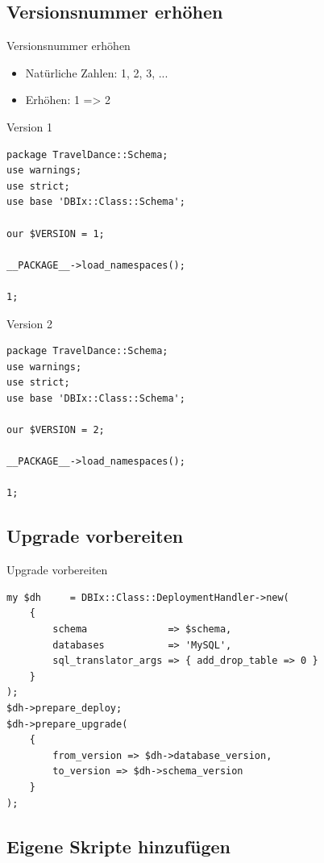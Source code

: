 \subsection{Versionsnummer erhöhen}
\begin{frame}{Versionsnummer erhöhen}
\begin{itemize}
\item Natürliche Zahlen: 1, 2, 3, ...
\item Erhöhen: 1 => 2
\end{itemize}
\end{frame}

\begin{frame}[fragile]{Version 1}
\begin{lstlisting}
package TravelDance::Schema;
use warnings;
use strict;
use base 'DBIx::Class::Schema';

our $VERSION = 1;

__PACKAGE__->load_namespaces();

1;
\end{lstlisting}
\end{frame}

\begin{frame}[fragile]{Version 2}
\begin{lstlisting}
package TravelDance::Schema;
use warnings;
use strict;
use base 'DBIx::Class::Schema';

our $VERSION = 2;

__PACKAGE__->load_namespaces();

1;
\end{lstlisting}
\end{frame}

\subsection{Upgrade vorbereiten}

\begin{frame}[fragile]{Upgrade vorbereiten}
\begin{lstlisting}
my $dh     = DBIx::Class::DeploymentHandler->new(
    {
        schema              => $schema,
        databases           => 'MySQL',
        sql_translator_args => { add_drop_table => 0 }
    }
);
$dh->prepare_deploy;
$dh->prepare_upgrade(
    {
        from_version => $dh->database_version,
        to_version => $dh->schema_version
    }
);
\end{lstlisting}
\end{frame}

\subsection{Eigene Skripte hinzufügen}

